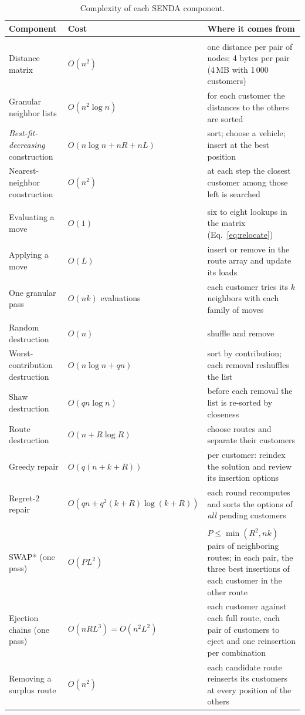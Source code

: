 \documentclass[11pt,a4paper]{article}
\begin{document}
\begin{table}[htbp]
\centering
\caption{Complexity of each SENDA component.}
\label{tab:complejidad}
\footnotesize
\begin{tabular}{@{}>{\raggedright\arraybackslash}p{4.3cm}>{\raggedright\arraybackslash}p{4.4cm}>{\raggedright\arraybackslash}p{6.5cm}@{}}
\toprule
Component & Cost & Where it comes from \\
\midrule
\multicolumn{3}{@{}l}{\emph{Once per run}} \\
Distance matrix & $O(n^2)$ & one distance per pair of nodes; 4 bytes per pair (4\,MB with 1\,000 customers) \\
Granular neighbor lists & $O(n^2\log n)$ & for each customer the distances to the others are sorted \\
\emph{Best-fit-decreasing} construction & $O(n\log n+nR+nL)$ & sort; choose a vehicle; insert at the best position \\
Nearest-neighbor construction & $O(n^2)$ & at each step the closest customer among those left is searched \\
\midrule
\multicolumn{3}{@{}l}{\emph{Local search}} \\
Evaluating a move & $O(1)$ & six to eight lookups in the matrix (Eq.~\ref{eq:relocate}) \\
Applying a move & $O(L)$ & insert or remove in the route array and update its loads \\
One granular pass & $O(nk)$ evaluations & each customer tries its $k$ neighbors with each family of moves \\
\midrule
\multicolumn{3}{@{}l}{\emph{One ALNS iteration}} \\
Random destruction & $O(n)$ & shuffle and remove \\
Worst-contribution destruction & $O(n\log n+qn)$ & sort by contribution; each removal reshuffles the list \\
Shaw destruction & $O(qn\log n)$ & before each removal the list is re-sorted by closeness \\
Route destruction & $O(n+R\log R)$ & choose routes and separate their customers \\
Greedy repair & $O(q(n+k+R))$ & per customer: reindex the solution and review its insertion options \\
Regret-2 repair & $O(qn+q^2(k+R)\log(k+R))$ & each round recomputes and sorts the options of \emph{all} pending customers \\
\midrule
\multicolumn{3}{@{}l}{\emph{Intensification}} \\
SWAP* (one pass) & $O(PL^2)$ & $P\le\min(R^2,nk)$ pairs of neighboring routes; in each pair, the three best insertions of each customer in the other route \\
Ejection chains (one pass) & $O(nRL^3)=O(n^2L^2)$ & each customer against each full route, each pair of customers to eject and one reinsertion per combination \\
Removing a surplus route & $O(n^2)$ & each candidate route reinserts its customers at every position of the others \\
\bottomrule
\end{tabular}
\end{table}
\end{document}
